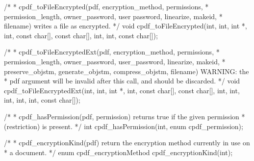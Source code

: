 /*
 * cpdf_toFileEncrypted(pdf, encryption_method, permissions,
 * permission_length, owner_password, user password, linearize, makeid,
 * filename) writes a file as encrypted.
 */
void cpdf_toFileEncrypted(int, int, int *, int, const char[], const char[], int,
                          int, const char[]);

/*
 * cpdf_toFileEncryptedExt(pdf, encryption_method, permissions,
 * permission_length, owner_password, user_password, linearize, makeid,
 * preserve_objstm, generate_objstm, compress_objstm, filename) WARNING: the
 * pdf argument will be invalid after this call, and should be discarded.
 */
void cpdf_toFileEncryptedExt(int, int, int *, int, const char[], const char[],
                             int, int, int, int, int, const char[]);

/*
 * cpdf_hasPermission(pdf, permission) returns true if the given permission
 * (restriction) is present.
 */
int cpdf_hasPermission(int, enum cpdf_permission);

/*
 * cpdf_encryptionKind(pdf) return the encryption method currently in use on
 * a document.
 */
enum cpdf_encryptionMethod cpdf_encryptionKind(int);


